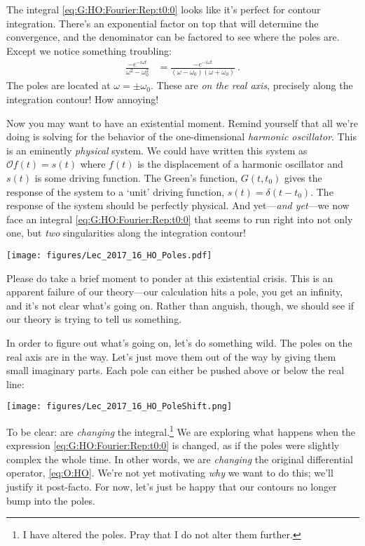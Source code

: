 The integral \eqref{eq:G:HO:Fourier:Rep:t0:0} looks like it's perfect for contour integration. There's an exponential factor on top that will determine the convergence, and the denominator can be factored to see where the poles are. Except we notice something troubling:
\begin{align}
	\frac{-e^{-i\omega t}}{\omega^2-\omega_0^2} 
	&=
	\frac{-e^{-i\omega t}}{(\omega - \omega_0)(\omega + \omega_0)} \ .
	\label{eq:HO:integrand:real:pole}
\end{align}
The poles are located at $\omega = \pm \omega_0$. These are \emph{on the real axis}, precisely along the integration contour! How annoying!

Now you may want to have an existential moment. Remind yourself that all we're doing is solving for the behavior of the one-dimensional \emph{harmonic oscillator}. This is an eminently \emph{physical} system. We could have written this system as $\mathcal O f(t) = s(t)$ where $f(t)$ is the displacement of a harmonic oscillator and $s(t)$ is some driving function. The Green's function, $G(t,t_0)$ gives the response of the system to a `unit' driving function, $s(t) = \delta(t-t_0)$. The response of the system should be perfectly physical. And yet---\emph{and yet}---we now face an integral \eqref{eq:G:HO:Fourier:Rep:t0:0} that seems to run right into not only one, but \emph{two} singularities along the integration contour!
\begin{center}
\texttt{[image: figures/Lec\_2017\_16\_HO\_Poles.pdf]}
\end{center}
Please do take a brief moment to ponder at this existential crisis. This is an apparent failure of our theory---our calculation hits a pole, you get an infinity, and it's not clear what's going on. Rather than anguish, though, we should see if our theory is trying to tell us something. 

In order to figure out what's going on, let's do something wild. The poles on the real axis are in the way. Let's just move them out of the way by giving them small imaginary parts. Each pole can either be pushed above or below the real line:
\begin{center}
\texttt{[image: figures/Lec\_2017\_16\_HO\_PoleShift.png]}
\end{center}
To be clear: are \emph{changing} the integral.\footnote{I have altered the poles. Pray that I do not alter them further.} We are exploring what happens when the expression \eqref{eq:G:HO:Fourier:Rep:t0:0} is changed, as if the poles were slightly complex the whole time. In other words, we are \emph{changing} the original differential operator, \eqref{eq:O:HO}. We're not yet motivating \emph{why} we want to do this; we'll justify it post-facto. For now, let's just be happy that our contours no longer bump into the poles. 

